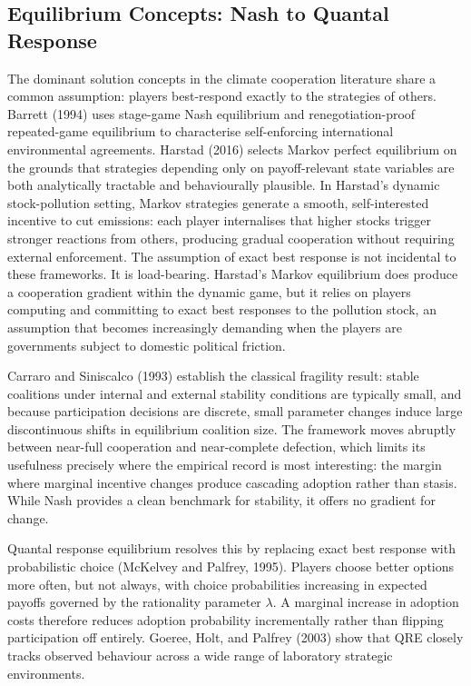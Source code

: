 \documentclass[10pt,a4paper]{article}
\begin{document}
\needspace{12em}
\subsection*{Equilibrium Concepts: Nash to Quantal Response}

The dominant solution concepts in the climate cooperation literature share a common assumption: players
best-respond exactly to the strategies of others. Barrett (1994) uses stage-game Nash equilibrium and
renegotiation-proof repeated-game equilibrium to characterise self-enforcing international environmental
agreements. Harstad (2016) selects Markov perfect equilibrium on the grounds that strategies depending
only on payoff-relevant state variables are both analytically tractable and behaviourally plausible. In
Harstad's dynamic stock-pollution setting, Markov strategies generate a smooth, self-interested incentive
to cut emissions: each player internalises that higher stocks trigger stronger reactions from others,
producing gradual cooperation without requiring external enforcement. The assumption of exact best
response is not incidental to these frameworks. It is load-bearing. Harstad's Markov equilibrium does
produce a cooperation gradient within the dynamic game, but it relies on players computing and
committing to exact best responses to the pollution stock, an assumption that becomes increasingly
demanding when the players are governments subject to domestic political friction.

Carraro and Siniscalco (1993) establish the classical fragility result: stable coalitions under internal and
external stability conditions are typically small, and because participation decisions are discrete, small
parameter changes induce large discontinuous shifts in equilibrium coalition size. The framework moves
abruptly between near-full cooperation and near-complete defection, which limits its usefulness precisely
where the empirical record is most interesting: the margin where marginal incentive changes produce
cascading adoption rather than stasis. While Nash provides a clean benchmark for stability, it offers no gradient for change.

Quantal response equilibrium resolves this by replacing exact best response with probabilistic choice
(McKelvey and Palfrey, 1995). Players choose better options more often, but not always, with choice
probabilities increasing in expected payoffs governed by the rationality parameter $\lambda$. A marginal increase
in adoption costs therefore reduces adoption probability incrementally rather than flipping participation
off entirely. Goeree, Holt, and Palfrey (2003) show that QRE closely tracks observed behaviour across a
wide range of laboratory strategic environments.
\end{document}
